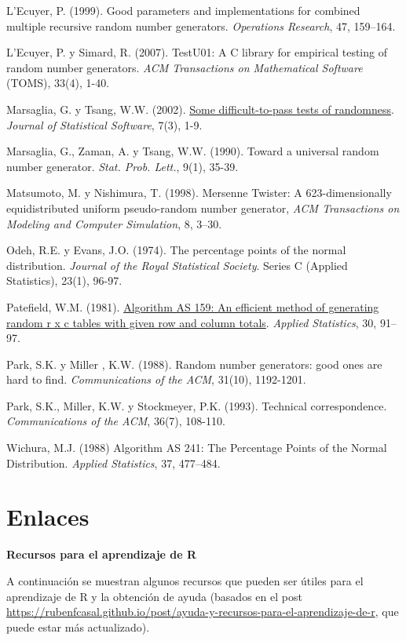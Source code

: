 \documentclass[
]{book}
\theoremstyle{break}
\theoremstyle{definition}
\theoremstyle{definition}
\theoremstyle{definition}
\theoremstyle{definition}
\theoremstyle{remark}
\begin{document}
L'Ecuyer, P. (1999). Good parameters and implementations for combined multiple recursive random number generators. \emph{Operations Research}, 47, 159--164.

L'Ecuyer, P. y Simard, R. (2007). TestU01: A C library for empirical testing of random number generators. \emph{ACM Transactions on Mathematical Software} (TOMS), 33(4), 1-40.

Marsaglia, G. y Tsang, W.W. (2002). \href{http://www.jstatsoft.org/v07/i03}{Some difficult-to-pass tests of randomness}. \emph{Journal of Statistical Software}, 7(3), 1-9.

Marsaglia, G., Zaman, A. y Tsang, W.W. (1990). Toward a universal random number generator. \emph{Stat. Prob. Lett.}, 9(1), 35-39.

Matsumoto, M. y Nishimura, T. (1998). Mersenne Twister: A 623-dimensionally equidistributed uniform pseudo-random number generator, \emph{ACM Transactions on Modeling and Computer Simulation}, 8, 3--30.

Odeh, R.E. y Evans, J.O. (1974). The percentage points of the normal distribution. \emph{Journal of the Royal Statistical Society}. Series C (Applied Statistics), 23(1), 96-97.

Patefield, W.M. (1981). \href{https://doi.org/10.2307/2346669}{Algorithm AS 159: An efficient method of generating random r x c tables with given row and column totals}. \emph{Applied Statistics}, 30, 91--97.

Park, S.K. y Miller , K.W. (1988). Random number generators: good ones are hard to find. \emph{Communications of the ACM}, 31(10), 1192-1201.

Park, S.K., Miller, K.W. y Stockmeyer, P.K. (1993). Technical correspondence. \emph{Communications of the ACM}, 36(7), 108-110.

Wichura, M.J. (1988) Algorithm AS 241: The Percentage Points of the Normal Distribution. \emph{Applied Statistics}, 37, 477--484.

\hypertarget{appendix-apendices}{%
\appendix}


\hypertarget{links}{%
\chapter{Enlaces}\label{links}}

\textbf{Recursos para el aprendizaje de R}

A continuación se muestran algunos recursos que pueden ser útiles para el aprendizaje de R y la obtención de ayuda
(basados en el post \url{https://rubenfcasal.github.io/post/ayuda-y-recursos-para-el-aprendizaje-de-r},
que puede estar más actualizado).
\end{document}
